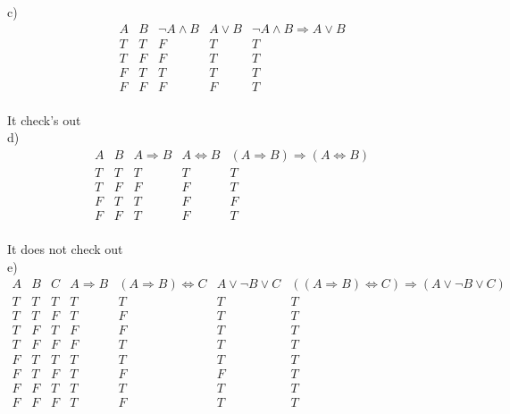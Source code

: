 \documentclass{article}
\begin{document}
c)\\
\begin{displaymath}
\begin{array}{|c|c|c|c|c|c}

A & 
B & 
\neg A \wedge B & 
A \vee B & \neg A \wedge B \Rightarrow A \vee B\\ %
\hline  %
T & T & F & T & T\\
T & F & F & T & T\\
F & T & T & T & T\\
F & F & F & F & T\\

\end{array}
\end{displaymath}

It check's out\\


d)\\
\begin{displaymath}
\begin{array}{|c|c|c|c|c|c}

A & 
B & 
A \Rightarrow B & 
A \Leftrightarrow B & 
(A \Rightarrow B) \Rightarrow (A \Leftrightarrow B)\\ %
\hline  %
T & T & T & T & T\\
T & F & F & F & T\\
F & T & T & F & F\\
F & F & T & F & T\\

\end{array}
\end{displaymath}

It does not check out\\

e)\\
\begin{displaymath}
\begin{array}{|c|c|c|c|c|c|c|c}

A & 
B & 
C &
A \Rightarrow B & 
(A \Rightarrow B) \Leftrightarrow C &
A \vee \neg B \vee C &
((A \Rightarrow B) \Leftrightarrow C) \Rightarrow (A \vee \neg B \vee C)\\ %
\hline  %
T & T & T & T & T & T & T\\
T & T & F & T & F & T & T\\
T & F & T & F & F & T & T\\
T & F & F & F & T & T & T\\
F & T & T & T & T & T & T\\
F & T & F & T & F & F & T\\
F & F & T & T & T & T & T\\
F & F & F & T & F & T & T\\

\end{array}
\end{displaymath}
\end{document}
